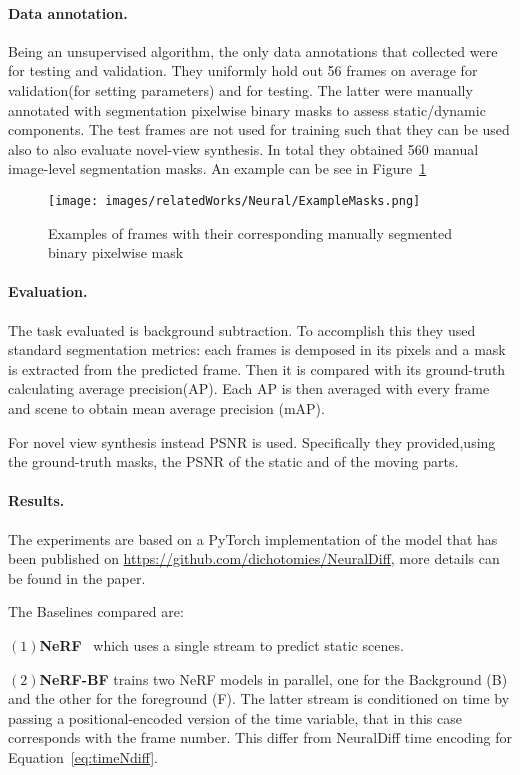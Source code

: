 \paragraph{Data annotation.}
Being an unsupervised algorithm, the only data annotations that collected were for testing and 
validation. They uniformly hold out 56 frames on average for validation(for setting parameters)
and for testing. The latter were manually annotated with segmentation pixelwise binary masks to assess static/dynamic components.
The test frames are not used for training such that they can be used also to also evaluate 
novel-view synthesis. In total they obtained 560 manual image-level segmentation masks. An example can
be see in Figure~\ref{fig:exMasks}
\begin{figure}[t]
    \centering
    \texttt{[image: images/relatedWorks/Neural/ExampleMasks.png]} 
    \caption{Examples of frames with their corresponding manually segmented binary pixelwise mask}\label{fig:exMasks}
\end{figure}

\paragraph{Evaluation.}The task evaluated is background subtraction. To accomplish this they
used standard segmentation metrics: each frames is demposed in its pixels and a mask is 
extracted from the predicted frame. Then it is compared with its ground-truth calculating 
average precision(AP). Each AP is then averaged with every frame and scene to obtain mean 
average precision (mAP).

For novel view synthesis instead PSNR is used. Specifically they provided,using the 
ground-truth masks, the PSNR of the static and of the moving parts.\vspace{0.4cm}

\paragraph{Results.} The experiments are based on a PyTorch implementation of the model
that has been published on \url{https://github.com/dichotomies/NeuralDiff}, more details 
can be found in the paper. 

The Baselines compared are:

$(1)$\textbf{NeRF}~\cite{nerf} which uses a single stream to predict static scenes.

$(2)$\textbf{NeRF-BF} trains two NeRF models in parallel, one for the Background (B) and the
other for the foreground (F). The latter stream is conditioned on time by passing a
positional-encoded version of the time variable, that in this case corresponds with 
the frame number. This differ from NeuralDiff time encoding for Equation~\ref{eq:timeNdiff}.


